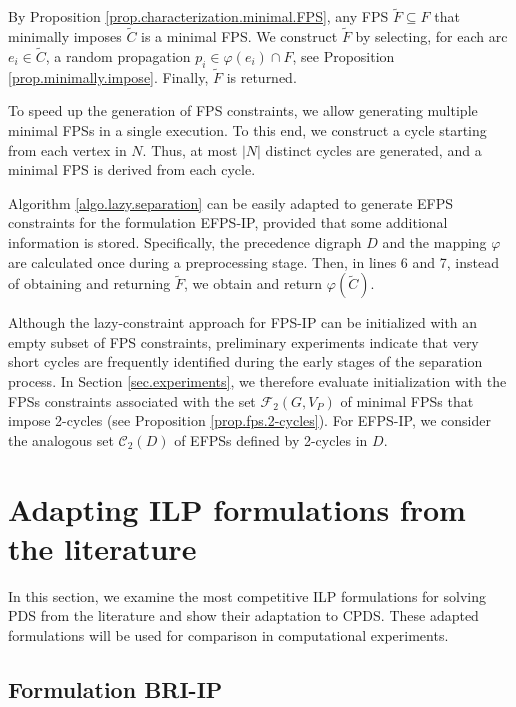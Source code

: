 \documentclass{article}
\newcommand{\FPSIP}{FPS-IP\xspace}
\newcommand{\EFPSIP}{EFPS-IP\xspace}
\newcommand{\BRIIP}{BRI-IP\xspace}
\begin{document}
By Proposition \ref{prop.characterization.minimal.FPS}, any FPS $\tilde F \subseteq F$ that minimally imposes $\tilde C$ is a minimal FPS.
We construct $\tilde F$ by selecting, for each arc $e_i \in \tilde C$, a random propagation $p_i \in \varphi(e_i) \cap F$, see Proposition \ref{prop.minimally.impose}.
Finally, $\tilde F$ is returned.

To speed up the generation of FPS constraints, we allow generating multiple minimal FPSs in a single execution. 
To this end, we construct a cycle starting from each vertex in $N$. 
Thus, at most $|N|$ distinct cycles are generated, and a minimal FPS is derived from each cycle.

Algorithm \ref{algo.lazy.separation} can be easily adapted to generate EFPS constraints for the formulation \EFPSIP, provided that some additional information is stored.
Specifically, the precedence digraph $D$ and the mapping $\varphi$ are calculated once during a preprocessing stage.
Then, in lines 6 and 7, instead of obtaining and returning $\tilde F$, we obtain and return $\varphi(\tilde C)$.


Although the lazy-constraint approach for \FPSIP can be initialized with an empty subset of FPS constraints, preliminary experiments indicate that very short cycles are frequently identified during the early stages of the separation process. 
In Section \ref{sec.experiments}, we therefore evaluate initialization with the FPSs constraints associated with the set $\mathcal{F}_2(G,V_P)$ of minimal FPSs that impose 2-cycles (see Proposition \ref{prop.fps.2-cycles}). 
For \EFPSIP, we consider the analogous set $\mathcal{C}_2(D)$ of EFPSs defined by 2-cycles in $D$.


\section{Adapting ILP formulations from the literature}\label{sec.formulations.from.literature}

In this section, we examine the most competitive ILP formulations for solving PDS from the literature and show their adaptation to CPDS.
These adapted formulations will be used for comparison in computational experiments.

\subsection{Formulation \BRIIP}
\end{document}
